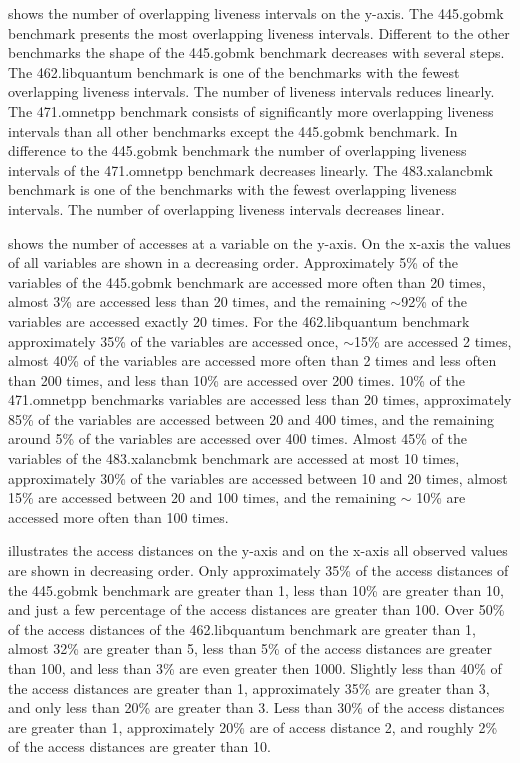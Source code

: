 \documentclass[onecolumn, openright, master, english, signatures]{dbrgrptt}
\begin{document}
 shows the number of overlapping liveness intervals on the y-axis.
The 445.gobmk benchmark presents the most overlapping liveness intervals.
Different to the other benchmarks the shape of the 445.gobmk benchmark decreases with several steps.
The 462.libquantum benchmark is one of the benchmarks with the fewest overlapping liveness intervals.
The number of liveness intervals reduces linearly.
The 471.omnetpp benchmark consists of significantly more overlapping liveness intervals than all other benchmarks except the 445.gobmk benchmark.
In difference to the 445.gobmk benchmark the number of overlapping liveness intervals of the 471.omnetpp benchmark decreases linearly.
The 483.xalancbmk benchmark is one of the benchmarks with the fewest overlapping liveness intervals. The number of overlapping liveness intervals decreases linear.

 shows the number of accesses at a variable on the y-axis.
On the x-axis the values of all variables are shown in a decreasing order.
Approximately 5\% of the variables of the 445.gobmk benchmark are accessed more often than 20 times, almost 3\% are accessed less than 20 times, and the remaining $\sim$92\% of the variables are accessed exactly 20 times.
For the 462.libquantum benchmark approximately 35\% of the variables are accessed once, $\sim$15\% are accessed 2 times, almost 40\% of the variables are accessed more often than 2 times and less often than 200 times, and less than 10\% are accessed over 200 times.
10\% of the 471.omnetpp benchmarks variables are accessed less than 20 times, approximately 85\% of the variables are accessed between 20 and 400 times, and the remaining around 5\% of the variables are accessed over 400 times.
Almost 45\% of the variables of the 483.xalancbmk benchmark are accessed at most 10 times, approximately 30\% of the variables are accessed between 10 and 20 times, almost 15\% are accessed between 20 and 100 times, and the remaining $\sim$ 10\% are accessed more often than 100 times.

 illustrates the access distances on the y-axis and on the x-axis all observed values are shown in decreasing order.
Only approximately 35\% of the access distances of the 445.gobmk benchmark are greater than 1, less than 10\% are greater than 10, and just a few percentage of the access distances are greater than 100.
Over 50\% of the access distances of the 462.libquantum benchmark are greater than 1, almost 32\% are greater than 5, less than 5\% of the access distances are greater than 100, and less than 3\% are even greater then 1000.
Slightly less than 40\% of the access distances are greater than 1, approximately 35\% are greater than 3, and only less than 20\% are greater than 3.
Less than 30\% of the access distances are greater than 1, approximately 20\% are of access distance 2, and roughly 2\% of the access distances are greater than 10.
\end{document}
